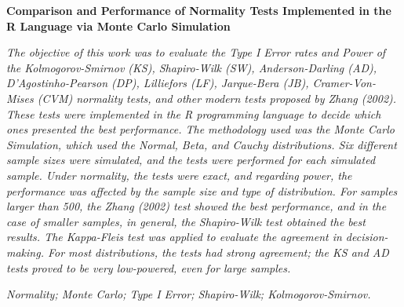 \documentclass[a4paper,11pt]{article} %
\begin{document}
\begin{center}
    {\large {\bf Comparison and Performance of Normality Tests Implemented in the R Language via Monte Carlo Simulation}\vspace{0.3cm}}
\end{center}
\begin{small}
 {\it 
    The objective of this work was to evaluate the Type I Error rates and Power of the Kolmogorov-Smirnov (KS), Shapiro-Wilk (SW), Anderson-Darling (AD), D’Agostinho-Pearson (DP), Lilliefors (LF), Jarque-Bera (JB), Cramer-Von-Mises (CVM) normality tests, and other modern tests proposed by Zhang (2002). These tests were implemented in the R programming language to decide which ones presented the best performance. The methodology used was the Monte Carlo Simulation, which used the Normal, Beta, and Cauchy distributions. Six different sample sizes were simulated, and the tests were performed for each simulated sample. Under normality, the tests were exact, and regarding power, the performance was affected by the sample size and type of distribution. For samples larger than 500, the Zhang (2002) test showed the best performance, and in the case of smaller samples, in general, the Shapiro-Wilk test obtained the best results. The Kappa-Fleis test was applied to evaluate the agreement in decision-making. For most distributions, the tests had strong agreement; the KS and AD tests proved to be very low-powered, even for large samples.
}
    
\vspace{0.5cm}

  {\it Normality; Monte Carlo; Type I Error; Shapiro-Wilk; Kolmogorov-Smirnov.\vspace{0.3cm}}
\end{small}
\newpage                                                                                   
\pagestyle{fancy}                                                                          
\renewcommand{\thefootnote}{\roman{footnote}}                                              
\lhead{}
\chead{\small \slshape}
\rhead{\thepage}
\lfoot{}
\rfoot{}
\end{document}
